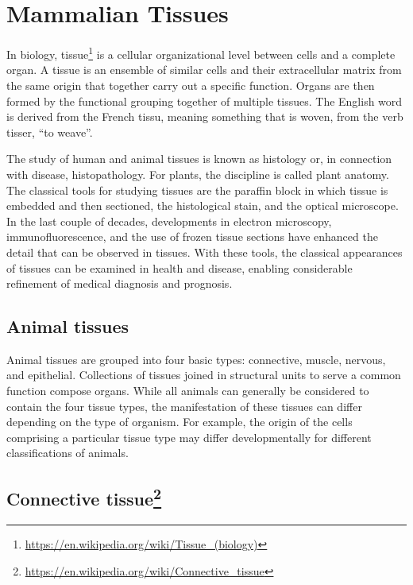 \documentclass[]{book}
\let\rmarkdownfootnote\footnote%
\def\footnote{\protect\rmarkdownfootnote}
\renewcommand{\href}[2]{#2\footnote{\url{#1}}}
\begin{document}
\hypertarget{mammalian-tissues}{%
\chapter{Mammalian Tissues}\label{mammalian-tissues}}

In biology, \href{https://en.wikipedia.org/wiki/Tissue_(biology)}{tissue} is a cellular organizational level between cells and a complete organ. A tissue is an ensemble of similar cells and their extracellular matrix from the same origin that together carry out a specific function. Organs are then formed by the functional grouping together of multiple tissues. The English word is derived from the French tissu, meaning something that is woven, from the verb tisser, ``to weave''.

The study of human and animal tissues is known as histology or, in connection with disease, histopathology. For plants, the discipline is called plant anatomy. The classical tools for studying tissues are the paraffin block in which tissue is embedded and then sectioned, the histological stain, and the optical microscope. In the last couple of decades, developments in electron microscopy, immunofluorescence, and the use of frozen tissue sections have enhanced the detail that can be observed in tissues. With these tools, the classical appearances of tissues can be examined in health and disease, enabling considerable refinement of medical diagnosis and prognosis.

\hypertarget{animal-tissues}{%
\section{Animal tissues}\label{animal-tissues}}

Animal tissues are grouped into four basic types: connective, muscle, nervous, and epithelial. Collections of tissues joined in structural units to serve a common function compose organs. While all animals can generally be considered to contain the four tissue types, the manifestation of these tissues can differ depending on the type of organism. For example, the origin of the cells comprising a particular tissue type may differ developmentally for different classifications of animals.

\hypertarget{connective-tissue}{%
\section{\texorpdfstring{\href{https://en.wikipedia.org/wiki/Connective_tissue}{Connective tissue}}{Connective tissue}}\label{connective-tissue}}
\end{document}
